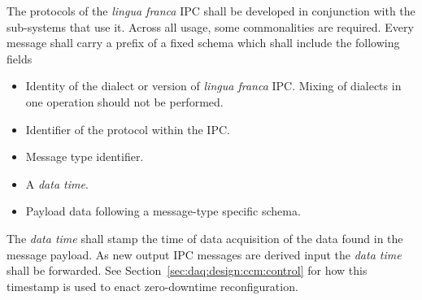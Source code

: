 The protocols of the \textit{lingua franca} IPC shall be developed in conjunction with the  sub-systems that use it. 
Across all usage, some commonalities are required. 
Every message shall carry a prefix of a fixed schema which shall include the following fields

\begin{itemize}
\item Identity of the dialect or version of \textit{lingua franca} IPC.  Mixing of dialects in one operation should not be performed.
\item Identifier of the protocol within the IPC.
\item Message type identifier.
\item A \textit{data time}.
\item Payload data following a message-type specific schema.
\end{itemize}

The \textit{data time} shall stamp the time of data acquisition of the data found in the message payload. 
As new output IPC messages are derived input the \textit{data time} shall be forwarded.
See Section~\ref{sec:daq:design:ccm:control} for how this timestamp is used to enact zero-downtime reconfiguration.







